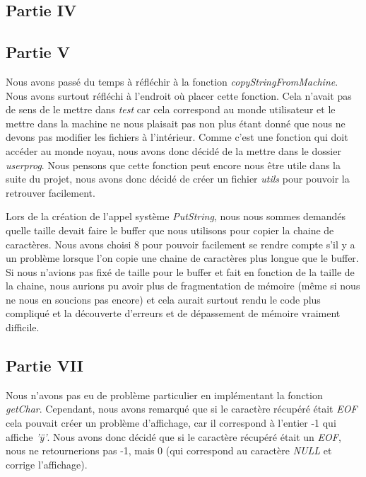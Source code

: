 \documentclass{article}
\begin{document}
    \subsection{Partie IV}

    \subsection{Partie V}
    Nous avons passé du temps à réfléchir à la fonction
    \textit{copyStringFromMachine}. Nous avons surtout réfléchi à l'endroit où
    placer cette fonction. Cela n'avait pas de sens de le mettre dans \textit{test}
    car cela correspond au monde utilisateur et le mettre dans la machine ne nous
    plaisait pas non plus étant donné que nous ne devons pas modifier les fichiers
    à l'intérieur. Comme c'est une fonction qui doit accéder au monde noyau, nous
    avons donc décidé de la mettre dans le dossier \textit{userprog}. Nous pensons
    que cette fonction peut encore nous être utile dans la suite du projet, nous
    avons donc décidé de créer un fichier \textit{utils} pour pouvoir la retrouver
    facilement.

    Lors de la création de l'appel système \textit{PutString}, nous nous sommes
    demandés quelle taille devait faire le buffer que nous utilisons pour copier la
    chaine de caractères. Nous avons choisi 8 pour pouvoir facilement se rendre
    compte s'il y a un problème lorsque l'on copie une chaine de caractères plus
    longue que le buffer. Si nous n'avions pas fixé de taille pour le buffer et
    fait en fonction de la taille de la chaine, nous aurions pu avoir plus de
    fragmentation de mémoire (même si nous ne nous en soucions pas encore) et cela
    aurait surtout rendu le code plus compliqué et la découverte d'erreurs et de
    dépassement de mémoire vraiment difficile.

    \subsection{Partie VII} \label{bugPartieVII}
    Nous n'avons pas eu de problème particulier en implémentant la fonction
    \textit{getChar}. Cependant, nous avons remarqué que si le caractère récupéré
    était \textit{EOF} cela pouvait créer un problème d'affichage, car il
    correspond à l'entier -1 qui affiche \textit{'ÿ'}. Nous avons donc décidé que
    si le caractère récupéré était un \textit{EOF}, nous ne retournerions pas -1,
    mais 0 (qui correspond au caractère \textit{NULL} et corrige l'affichage).
\end{document}
